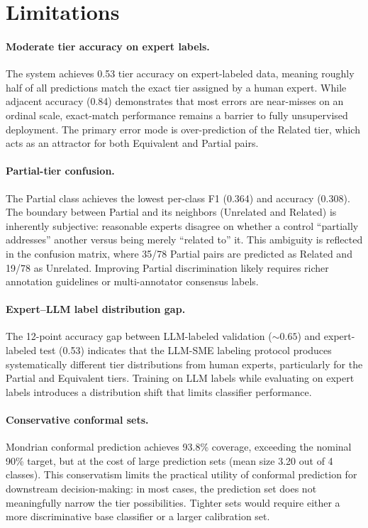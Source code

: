\section{Limitations}
\label{sec:limitations}

\paragraph{Moderate tier accuracy on expert labels.}
The system achieves 0.53 tier accuracy on expert-labeled data, meaning
roughly half of all predictions match the exact tier assigned by a human
expert. While adjacent accuracy (0.84) demonstrates that most errors
are near-misses on an ordinal scale, exact-match performance remains a
barrier to fully unsupervised deployment. The primary error mode is
over-prediction of the Related tier, which acts as an attractor for
both Equivalent and Partial pairs.

\paragraph{Partial-tier confusion.}
The Partial class achieves the lowest per-class F1 (0.364) and accuracy
(0.308). The boundary between Partial and its neighbors (Unrelated and
Related) is inherently subjective: reasonable experts disagree on
whether a control ``partially addresses'' another versus being merely
``related to'' it. This ambiguity is reflected in the confusion matrix,
where 35/78 Partial pairs are predicted as Related and 19/78 as
Unrelated. Improving Partial discrimination likely requires richer
annotation guidelines or multi-annotator consensus labels.

\paragraph{Expert--LLM label distribution gap.}
The 12-point accuracy gap between LLM-labeled validation (${\sim}0.65$)
and expert-labeled test (0.53) indicates that the LLM-SME labeling
protocol produces systematically different tier distributions from human
experts, particularly for the Partial and Equivalent tiers. Training on
LLM labels while evaluating on expert labels introduces a distribution
shift that limits classifier performance.

\paragraph{Conservative conformal sets.}
Mondrian conformal prediction achieves 93.8\% coverage, exceeding the
nominal 90\% target, but at the cost of large prediction sets (mean
size 3.20 out of 4 classes). This conservatism limits the practical
utility of conformal prediction for downstream decision-making: in most
cases, the prediction set does not meaningfully narrow the tier
possibilities. Tighter sets would require either a more discriminative
base classifier or a larger calibration set.

